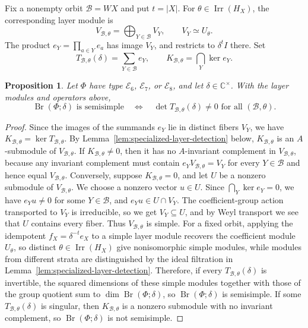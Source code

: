 \documentclass[11pt,a4paper]{amsart}
\newcommand{\Br}{\operatorname{Br}}\newcommand{\Irr}{\operatorname{Irr}}
\newtheorem{proposition}[theorem]{Proposition}
\theoremstyle{uprightdefinition}
\theoremstyle{remark}\newtheorem{remark}[theorem]{Remark}
\begin{document}
Fix a nonempty orbit $\mathcal B=WX$ and put $t=|X|$.
For $\theta\in\Irr(H_X)$, the corresponding layer module is
\[
 V_{\mathcal B,\theta}=\bigoplus_{Y\in\mathcal B}V_Y,
 \qquad V_Y\simeq U_\theta.
\]
The product $e_Y=\prod_{a\in Y}e_a$ has image $V_Y$, and restricts to
$\delta^tI$ there. Set
\[
 T_{\mathcal B,\theta}(\delta)=\sum_{Y\in\mathcal B}e_Y,
 \qquad K_{\mathcal B,\theta}=\bigcap_Y\ker e_Y.
\]
\begin{proposition}\label{prop:exceptional-layer-test}
Let $\Phi$ have type $\mathscr{E}_6$, $\mathscr{E}_7$, or $\mathscr{E}_8$, and let
$\delta\in\mathbb C^\times$. With the layer modules and operators above,
\begin{equation}\label{eq:app-layer-criterion}
 \Br(\Phi;\delta)\text{ is semisimple}
 \quad\Longleftrightarrow\quad
 \det T_{\mathcal B,\theta}(\delta)\ne0
 \text{ for all }(\mathcal B,\theta).
\end{equation}
\end{proposition}
\begin{proof}
Since the images of the summands $e_Y$ lie in distinct fibers $V_Y$, we have
$K_{\mathcal B,\theta}=\ker T_{\mathcal B,\theta}$.
By Lemma~\ref{lem:specialized-layer-detection} below,
$K_{\mathcal B,\theta}$ is an $A$-submodule of $V_{\mathcal B,\theta}$. If $K_{\mathcal B,\theta}\ne0$, then it has no
$A$-invariant complement in $V_{\mathcal B,\theta}$, because any invariant complement must contain
$e_YV_{\mathcal B,\theta}=V_Y$ for every $Y\in\mathcal B$ and hence equal $V_{\mathcal B,\theta}$.
Conversely, suppose $K_{\mathcal B,\theta}=0$, and let $U$ be a nonzero submodule of $V_{\mathcal B,\theta}$.
We choose a nonzero vector $u\in U$. Since $\bigcap_Y\ker e_Y=0$, we have $e_Yu\ne0$ for some $Y\in\mathcal B$, and $e_Yu\in U\cap V_Y$. The coefficient-group action transported to $V_Y$ is irreducible, so
we get $V_Y\subseteq U$, and by Weyl transport we see that $U$ contains every fiber. Thus $V_{\mathcal B,\theta}$ is simple.
For a fixed orbit, applying the idempotent $f_X=\delta^{-t}e_X$ to a simple layer module recovers
the coefficient module $U_\theta$, so distinct
$\theta\in\Irr(H_X)$ give nonisomorphic simple modules, while modules from different
strata are distinguished by the ideal filtration in
Lemma~\ref{lem:specialized-layer-detection}. Therefore, if every $T_{\mathcal B,\theta}(\delta)$ is
invertible, the squared dimensions of these simple modules together with those of the group
quotient sum to $\dim\Br(\Phi;\delta)$, so $\Br(\Phi;\delta)$ is semisimple.
If some $T_{\mathcal B,\theta}(\delta)$ is singular, then $K_{\mathcal B,\theta}$ is a nonzero submodule with no invariant complement, so $\Br(\Phi;\delta)$ is not semisimple.
\end{proof}
\end{document}
